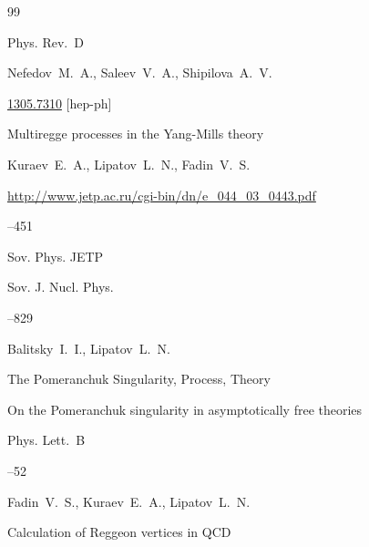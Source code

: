 \begin{thebibliography}{99}

\jour Phys. Rev.~D 



\by Nefedov~M.~A.,  Saleev~V.~A., Shipilova~A.~V.



\arxiv \href{http://arxiv.org/abs/1305.7310}{1305.7310} [hep-ph]




\paper Multiregge processes in the Yang-Mills theory 

\by Kuraev~E.~A., Lipatov~L.~N., Fadin~V.~S.

\elink \url{http://www.jetp.ac.ru/cgi-bin/dn/e_044_03_0443.pdf}

--451

\jour Sov. Phys. JETP 










\jour Sov. J. Nucl. Phys. 



--829

\by  Balitsky~I.~I., Lipatov~L.~N.

\paper The Pomeranchuk Singularity, Process, Theory




\paper On the Pomeranchuk singularity in asymptotically free theories


\jour Phys. Lett.~B 



--52

\by Fadin~V.~S., Kuraev~E.~A., Lipatov~L.~N.





\paper Calculation of Reggeon vertices in QCD


\end{thebibliography}
